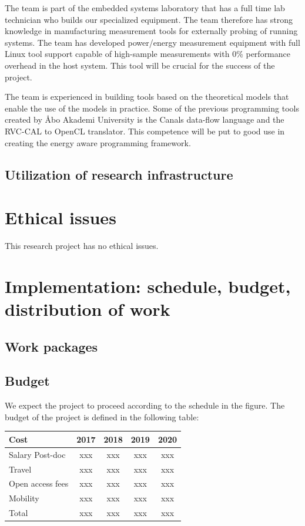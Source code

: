 \documentclass{article}
\begin{document}
The team is part of the embedded systems laboratory that has a full time lab technician who builds our specialized equipment. 
The team therefore has strong knowledge in manufacturing measurement tools for externally probing of running systems. 
The team has developed power/energy measurement equipment with full Linux tool support capable of high-sample measurements with 0\% performance overhead in the host system. 
This tool will be crucial for the success of the project.

The team is experienced in building tools based on the theoretical models that enable the use of the models in practice. 
Some of the previous programming tools created by \AA{}bo Akademi University is the Canals data-flow language and the RVC-CAL to OpenCL translator. 
This competence will be put to good use in creating the energy aware programming framework.

\subsection{Utilization of research infrastructure}

\section{Ethical issues}
This research project has no ethical issues.

\section{Implementation: schedule, budget, distribution of work}

\subsection{Work packages}

\subsection{Budget}
We expect the project to proceed according to the schedule in the figure.
The budget of the project is defined in the following table:
\begin{table}[h]
\begin{center}
\begin{tabular}{ | l | c | c |c |c |}
\hline
{Cost} & {2017} & {2018} & {2019} & {2020} \\ \hline
{Salary Post-doc} & xxx & xxx & xxx & xxx \\ \hline
{Travel} & xxx & xxx & xxx & xxx  \\ \hline
{Open access fees} & xxx & xxx & xxx & xxx  \\ \hline
{Mobility} & xxx & xxx & xxx & xxx  \\ \hline
{Total} & xxx & xxx & xxx & xxx  \\ \hline
\end{tabular}
\label{tab:strconf}
\end{center}

\end{table}
\end{document}
